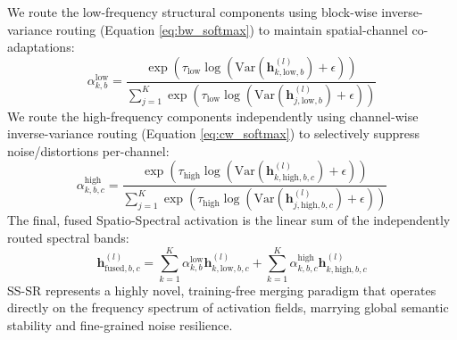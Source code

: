 \documentclass{article}
\theoremstyle{plain}
\theoremstyle{definition}
\theoremstyle{remark}
\begin{document}
    We route the low-frequency structural components using block-wise inverse-variance routing (Equation \ref{eq:bw_softmax}) to maintain spatial-channel co-adaptations:
    \begin{equation}
        \alpha^{\text{low}}_{k, b} = \frac{\exp\left(\tau_{\text{low}} \log\left(\text{Var}(\mathbf{h}_{k, \text{low}, b}^{(l)}) + \epsilon\right)\right)}{\sum_{j=1}^K \exp\left(\tau_{\text{low}} \log\left(\text{Var}(\mathbf{h}_{j, \text{low}, b}^{(l)}) + \epsilon\right)\right)}
    \end{equation}
    We route the high-frequency components independently using channel-wise inverse-variance routing (Equation \ref{eq:cw_softmax}) to selectively suppress noise/distortions per-channel:
    \begin{equation}
        \alpha^{\text{high}}_{k, b, c} = \frac{\exp\left(\tau_{\text{high}} \log\left(\text{Var}(\mathbf{h}_{k, \text{high}, b, c}^{(l)}) + \epsilon\right)\right)}{\sum_{j=1}^K \exp\left(\tau_{\text{high}} \log\left(\text{Var}(\mathbf{h}_{j, \text{high}, b, c}^{(l)}) + \epsilon\right)\right)}
    \end{equation}
    The final, fused Spatio-Spectral activation is the linear sum of the independently routed spectral bands:
    \begin{equation}
        \mathbf{h}_{\text{fused}, b, c}^{(l)} = \sum_{k=1}^K \alpha^{\text{low}}_{k, b} \mathbf{h}_{k, \text{low}, b, c}^{(l)} + \sum_{k=1}^K \alpha^{\text{high}}_{k, b, c} \mathbf{h}_{k, \text{high}, b, c}^{(l)}
    \end{equation}
    SS-SR represents a highly novel, training-free merging paradigm that operates directly on the frequency spectrum of activation fields, marrying global semantic stability and fine-grained noise resilience.
\end{document}
